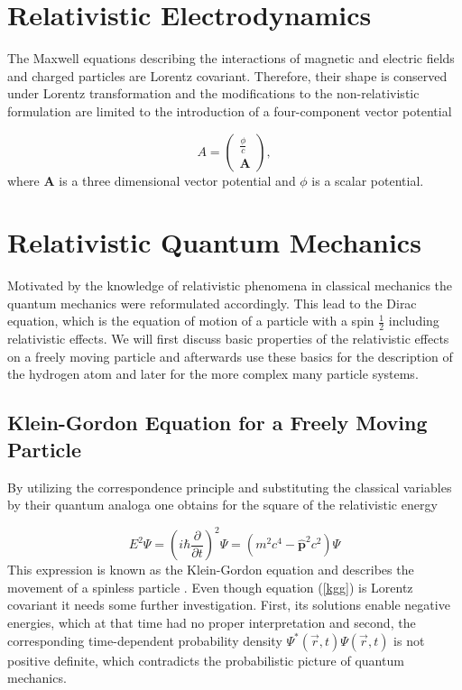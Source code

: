 \section{Relativistic Electrodynamics}
The Maxwell equations describing the interactions of magnetic and electric fields
and charged particles are Lorentz covariant. Therefore, their shape
is conserved under Lorentz transformation and the modifications to the
non-relativistic formulation are limited to the introduction of a four-component
vector potential

\begin{equation}
A = \begin{pmatrix}\frac{\phi}{c}\\\mathbf{A}\end{pmatrix},
\end{equation}
where $\mathbf{A}$ is a three dimensional vector potential and $\phi$ is a scalar
potential.



\section{Relativistic Quantum Mechanics}
Motivated by the knowledge of relativistic phenomena in classical mechanics
the quantum mechanics were reformulated accordingly. This lead to the
Dirac equation, which is the equation of motion of a particle with a spin
$\frac12$ including relativistic effects. We will first discuss basic
properties of the relativistic effects on a freely moving particle and afterwards
use these basics for the description of the hydrogen atom and later for the more
complex many particle systems.

\subsection{Klein-Gordon Equation for a Freely Moving Particle}
By utilizing the correspondence principle and substituting the classical variables
by their quantum analoga one obtains for the square of the relativistic energy



\begin{equation}\label{kgg}
E^2\Psi = \left(i\hbar \frac\partial{\partial t}\right)^2\Psi = \left(m^2c^4-\hat{\mathbf{p}}^2c^2\right) \Psi
\end{equation}
This expression is known as the Klein-Gordon equation and describes the movement of
a spinless particle \cite{kellogg97}.
Even though equation (\ref{kgg}) is Lorentz covariant it needs some further
investigation. First, its solutions enable negative energies, which at that
time had no proper interpretation
and second, the corresponding time-dependent probability
density $\Psi^*(\vec{r},t)\Psi(\vec{r},t)$ is not positive definite, which
contradicts the probabilistic picture of quantum mechanics.

